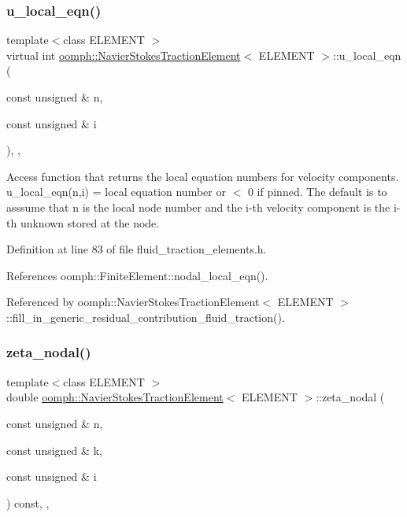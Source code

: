 \subsubsection{\texorpdfstring{u\+\_\+local\+\_\+eqn()}{u\_local\_eqn()}}
{\footnotesize\ttfamily template$<$class E\+L\+E\+M\+E\+NT $>$ \\
virtual int \hyperlink{classoomph_1_1NavierStokesTractionElement}{oomph\+::\+Navier\+Stokes\+Traction\+Element}$<$ E\+L\+E\+M\+E\+NT $>$\+::u\+\_\+local\+\_\+eqn (\begin{DoxyParamCaption}\item[{const unsigned \&}]{n,  }\item[{const unsigned \&}]{i }\end{DoxyParamCaption})\hspace{0.3cm}{\ttfamily [inline]}, {\ttfamily [protected]}, {\ttfamily [virtual]}}



Access function that returns the local equation numbers for velocity components. u\+\_\+local\+\_\+eqn(n,i) = local equation number or $<$ 0 if pinned. The default is to asssume that n is the local node number and the i-\/th velocity component is the i-\/th unknown stored at the node. 



Definition at line 83 of file fluid\+\_\+traction\+\_\+elements.\+h.



References oomph\+::\+Finite\+Element\+::nodal\+\_\+local\+\_\+eqn().



Referenced by oomph\+::\+Navier\+Stokes\+Traction\+Element$<$ E\+L\+E\+M\+E\+N\+T $>$\+::fill\+\_\+in\+\_\+generic\+\_\+residual\+\_\+contribution\+\_\+fluid\+\_\+traction().

\mbox{\label{classoomph_1_1NavierStokesTractionElement_a8ddd7c891c2654ea277fc569b4a0725a}} 
\subsubsection{\texorpdfstring{zeta\+\_\+nodal()}{zeta\_nodal()}}
{\footnotesize\ttfamily template$<$class E\+L\+E\+M\+E\+NT $>$ \\
double \hyperlink{classoomph_1_1NavierStokesTractionElement}{oomph\+::\+Navier\+Stokes\+Traction\+Element}$<$ E\+L\+E\+M\+E\+NT $>$\+::zeta\+\_\+nodal (\begin{DoxyParamCaption}\item[{const unsigned \&}]{n,  }\item[{const unsigned \&}]{k,  }\item[{const unsigned \&}]{i }\end{DoxyParamCaption}) const\hspace{0.3cm}{\ttfamily [inline]}, {\ttfamily [protected]}, {\ttfamily [virtual]}}



